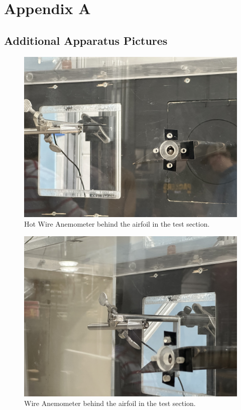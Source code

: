 \chapter{Appendix A}

\section{Additional Apparatus Pictures} \label{sec:additional_apparatus}

\begin{figure}[htpb]
    \centering
    \includegraphics[width=0.75\linewidth]{Figures/IMG_3205.jpg}
    \caption[Hot Wire Anemometer behind the airfoil in the test section.]{Hot Wire Anemometer behind the airfoil in the test section.}
    \label{fig: HotWireAnemometerclose}
\end{figure}

\begin{figure}[htpb]
    \centering
    \includegraphics[width=0.75\linewidth]{Figures/IMG_3206.jpg}
    \caption[Hot Wire Anemometer behind the airfoil in the test section.]{ Wire Anemometer behind the airfoil in the test section.}
    \label{fig: HotWireAnemometerfront}
\end{figure}

